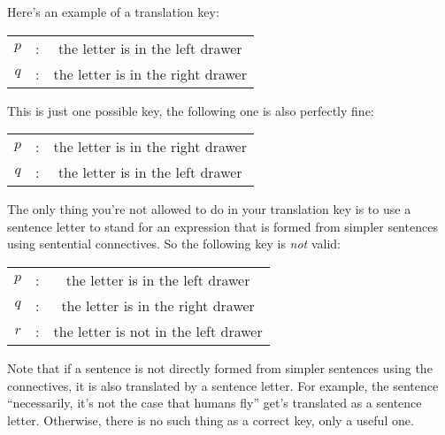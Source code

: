 \begin{enumerate}[\thesection.1]
Here's an example of a translation key:
	\begin{center}
	\begin{tabular}{c c c}
	$p$ & : & the letter is in the left drawer\\
	$q$ & : & the letter is in the right drawer
	\end{tabular}
	\end{center}
This is just one possible key, the following one is also perfectly fine:
	\begin{center}
	\begin{tabular}{c c c}
	$p$ & : & the letter is in the right drawer\\
	$q$ & : & the letter is in the left drawer
	\end{tabular}
	\end{center}	
The only thing you're not allowed to do in your translation key is to use a sentence letter to stand for an expression that is formed from simpler sentences using sentential connectives. So the following key is \emph{not} valid:
	\begin{center}
	\begin{tabular}{c c c}
	$p$ & : & the letter is in the left drawer\\
	$q$ & : & the letter is in the right drawer\\
	$r$ & : & the letter is not in the left drawer
	\end{tabular}
	\end{center}
Note that if a sentence is not directly formed from simpler sentences using the connectives, it is also translated by a sentence letter. For example, the sentence ``necessarily, it's not the case that humans fly'' get's translated as a sentence letter. Otherwise, there is no such thing as a correct key, only a useful one.


\end{enumerate}
